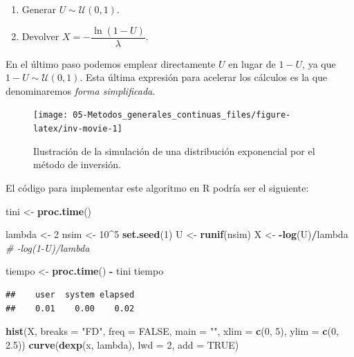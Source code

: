 \documentclass[
]{book}
\newenvironment{Shaded}{\begin{snugshade}}{\end{snugshade}}
\newcommand{\CommentTok}[1]{\textcolor[rgb]{0.56,0.35,0.01}{\textit{#1}}}
\newcommand{\DataTypeTok}[1]{\textcolor[rgb]{0.13,0.29,0.53}{#1}}
\newcommand{\DecValTok}[1]{\textcolor[rgb]{0.00,0.00,0.81}{#1}}
\newcommand{\FloatTok}[1]{\textcolor[rgb]{0.00,0.00,0.81}{#1}}
\newcommand{\KeywordTok}[1]{\textcolor[rgb]{0.13,0.29,0.53}{\textbf{#1}}}
\newcommand{\NormalTok}[1]{#1}
\newcommand{\OperatorTok}[1]{\textcolor[rgb]{0.81,0.36,0.00}{\textbf{#1}}}
\newcommand{\OtherTok}[1]{\textcolor[rgb]{0.56,0.35,0.01}{#1}}
\newcommand{\StringTok}[1]{\textcolor[rgb]{0.31,0.60,0.02}{#1}}
\theoremstyle{break}
\theoremstyle{definition}
\theoremstyle{definition}
\theoremstyle{definition}
\theoremstyle{remark}
\begin{document}
\begin{enumerate}
\def\labelenumi{\arabic{enumi}.}
\item
  Generar \(U \sim \mathcal{U}(0, 1)\).
\item
  Devolver \(X=-\dfrac{\ln \left( 1-U\right) }{\lambda }\).
\end{enumerate}

En el último paso podemos emplear directamente \(U\) en lugar de \(1-U\), ya que \(1 - U \sim \mathcal{U}(0, 1)\).
Esta última expresión para acelerar los cálculos es la que denominaremos \emph{forma simplificada}.

\begin{figure}[!htb]

{\centering \texttt{[image: 05-Metodos\_generales\_continuas\_files/figure-latex/inv-movie-1]} 

}

\caption{Ilustración de la simulación de una distribución exponencial por el método de inversión.}\label{fig:inv-movie}
\end{figure}

El código para implementar este algoritmo en R podría ser el siguiente:

\begin{Shaded}
\begin{Highlighting}[]
\NormalTok{tini <-}\StringTok{ }\KeywordTok{proc.time}\NormalTok{()}

\NormalTok{lambda <-}\StringTok{ }\DecValTok{2}
\NormalTok{nsim <-}\StringTok{ }\DecValTok{10}\OperatorTok{^}\DecValTok{5}
\KeywordTok{set.seed}\NormalTok{(}\DecValTok{1}\NormalTok{)}
\NormalTok{U <-}\StringTok{ }\KeywordTok{runif}\NormalTok{(nsim)}
\NormalTok{X <-}\StringTok{ }\OperatorTok{-}\KeywordTok{log}\NormalTok{(U)}\OperatorTok{/}\NormalTok{lambda }\CommentTok{# -log(1-U)/lambda}

\NormalTok{tiempo <-}\StringTok{ }\KeywordTok{proc.time}\NormalTok{() }\OperatorTok{-}\StringTok{ }\NormalTok{tini}
\NormalTok{tiempo}
\end{Highlighting}
\end{Shaded}

\begin{verbatim}
##    user  system elapsed 
##    0.01    0.00    0.02
\end{verbatim}

\begin{Shaded}
\begin{Highlighting}[]
\KeywordTok{hist}\NormalTok{(X, }\DataTypeTok{breaks =} \StringTok{"FD"}\NormalTok{, }\DataTypeTok{freq =} \OtherTok{FALSE}\NormalTok{, }
        \DataTypeTok{main =} \StringTok{""}\NormalTok{, }\DataTypeTok{xlim =} \KeywordTok{c}\NormalTok{(}\DecValTok{0}\NormalTok{, }\DecValTok{5}\NormalTok{), }\DataTypeTok{ylim =} \KeywordTok{c}\NormalTok{(}\DecValTok{0}\NormalTok{, }\FloatTok{2.5}\NormalTok{))}
\KeywordTok{curve}\NormalTok{(}\KeywordTok{dexp}\NormalTok{(x, lambda), }\DataTypeTok{lwd =} \DecValTok{2}\NormalTok{, }\DataTypeTok{add =} \OtherTok{TRUE}\NormalTok{)}
\end{Highlighting}
\end{Shaded}
\end{document}
